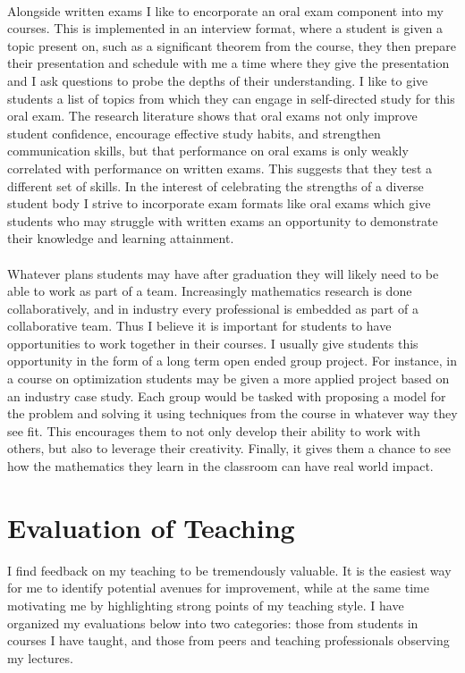 \documentclass{article}
\begin{document}
\paragraph{}
Alongside written exams I like to encorporate an oral exam component into my courses. This is implemented in an interview format, where a student is given a topic present on, such as a significant theorem from the course, they then prepare their presentation and schedule with me a time where they give the presentation and I ask questions to probe the depths of their understanding. I like to give students a list of topics from which they can engage in self-directed study for this oral exam. The research literature shows that oral exams not only improve student confidence, encourage effective study habits, and strengthen communication skills, but that performance on oral exams is only weakly correlated with performance on written exams. This suggests that they test a different set of skills. In the interest of celebrating the strengths of a diverse student body I strive to incorporate exam formats like oral exams which give students who may struggle with written exams an opportunity to demonstrate their knowledge and learning attainment.
\paragraph{}
Whatever plans students may have after graduation they will likely need to be able to work as part of a team. Increasingly mathematics research is done collaboratively, and in industry every professional is embedded as part of a collaborative team. Thus I believe it is important for students to have opportunities to work together in their courses. I usually give students this opportunity in the form of a long term open ended group project. For instance, in a course on optimization students may be given a more applied project based on an industry case study. Each group would be tasked with proposing a model for the problem and solving it using techniques from the course in whatever way they see fit. This encourages them to not only develop their ability to work with others, but also to leverage their creativity. Finally, it gives them a chance to see how the mathematics they learn in the classroom can have real world impact.

\section{Evaluation of Teaching}
I find feedback on my teaching to be tremendously valuable. It is the easiest way for me to identify potential avenues for improvement, while at the same time motivating me by highlighting strong points of my teaching style. I have organized my evaluations below into two categories: those from students in courses I have taught, and those from peers and teaching professionals observing my lectures.
\end{document}
